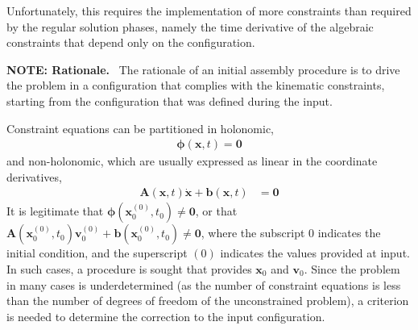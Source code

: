 \documentclass[10pt,dvips,fleqn,subeqn]{report}
\newcommand{\T}[1]{\bm{#1}}
\newcommand{\TT}[1]{\bm{#1}}
\begin{document}
Unfortunately, this requires the implementation of more constraints
than required by the regular solution phases, namely the time derivative
of the algebraic constraints that depend only on the configuration.

\bigskip



\textbf{NOTE: Rationale.} \
The rationale of an initial assembly procedure is to drive the problem
in a configuration that complies with the kinematic constraints,
starting from the configuration that was defined during the input.

Constraint equations can be partitioned in holonomic,
\begin{align}
	\T{\phi}(\T{x}, t) = \T{0}
\end{align}
and non-holonomic, which are usually expressed as linear in the coordinate derivatives,
\begin{align}
	\TT{A}(\T{x}, t) \dot{\T{x}} + \T{b}(\T{x}, t) &= \T{0}
\end{align}
It is legitimate that $\T{\phi}(\T{x}_0^{(0)}, t_0) \neq \T{0}$,
or that $\TT{A}(\T{x}_0^{(0)}, t_0) \T{v}_0^{(0)} + \T{b}(\T{x}_0^{(0)}, t_0) \neq \T{0}$,
where the subscript $0$ indicates the initial condition,
and the superscript $(0)$ indicates the values provided at input.
In such cases, a procedure is sought that provides $\T{x}_0$ and $\T{v}_0$.
Since the problem in many cases is underdetermined
(as the number of constraint equations is less than the number
of degrees of freedom of the unconstrained problem),
a criterion is needed to determine the correction to the input configuration.
\end{document}
